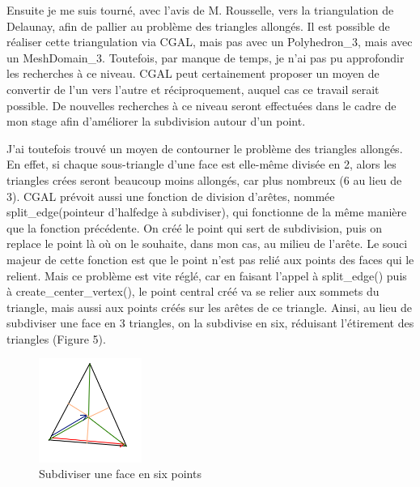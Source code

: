 \documentclass[a4paper,french]{report}
\begin{document}
					Ensuite je me suis tourné, avec l'avis de M. Rousselle, vers la triangulation de Delaunay, afin de pallier au problème des triangles allongés. Il est possible de réaliser cette triangulation via CGAL, mais pas avec un Polyhedron\_3, mais avec un MeshDomain\_3. Toutefois, par manque de temps, je n'ai pas pu approfondir les recherches à ce niveau. CGAL peut certainement proposer un moyen de convertir de l'un vers l'autre et réciproquement, auquel cas ce travail serait possible. De nouvelles recherches à ce niveau seront effectuées dans le cadre de mon stage afin d'améliorer la subdivision autour d'un point. \par
					J'ai toutefois trouvé un moyen de contourner le problème des triangles allongés. En effet, si chaque sous-triangle d'une face est elle-même divisée en 2, alors les triangles crées seront beaucoup moins allongés, car plus nombreux (6 au lieu de 3). CGAL prévoit aussi une fonction de division d'arêtes, nommée split\_edge(pointeur d'halfedge à subdiviser), qui fonctionne de la même manière que la fonction précédente. On créé le point qui sert de subdivision, puis on replace le point là où on le souhaite, dans mon cas, au milieu de l'arête. Le souci majeur de cette fonction est que le point n'est pas relié aux points des faces qui le relient. Mais ce problème est vite réglé, car en faisant l'appel à split\_edge() puis à create\_center\_vertex(), le point central créé va se relier aux sommets du triangle, mais aussi aux points créés sur les arêtes de ce triangle. Ainsi, au lieu de subdiviser une face en 3 triangles, on la subdivise en six, réduisant l'étirement des triangles (Figure 5). 
					\begin{figure}[h]
						\centering
						\includegraphics[width=0.3\textwidth]{FigBarycentricMeshSplit.png}
						\caption{Subdiviser une face en six points}
					\end{figure}
\end{document}
